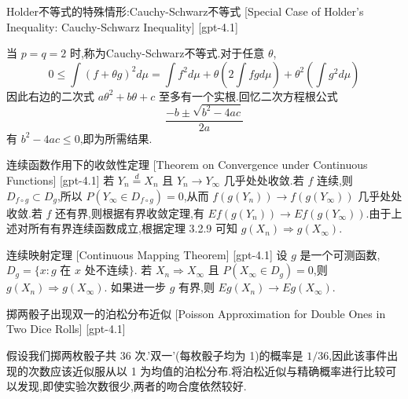 \documentclass[UTF8]{ctexart}
\begin{document}
    
    
    \begin{ppt}
        {Holder不等式的特殊情形:Cauchy-Schwarz不等式}
        [Special Case of Holder's Inequality: Cauchy-Schwarz Inequality]
        [gpt-4.1]
        
当 $p = q = 2$ 时,称为Cauchy-Schwarz不等式.对于任意 $\theta$,
\[
0 \leq \int (f + \theta g)^{2} d\mu = \int f^{2} d\mu + \theta \left( 2 \int f g d\mu \right) + \theta^{2} \left( \int g^{2} d\mu \right)
\]
因此右边的二次式 $a \theta^{2} + b \theta + c$ 至多有一个实根.回忆二次方程根公式
\[
\frac{ -b \pm \sqrt{b^{2} - 4 a c} }{2a}
\]
有 $b^{2} - 4ac \leq 0$,即为所需结果.

    \end{ppt}
    
    
    
    \begin{thm}
        {连续函数作用下的收敛性定理}
        [Theorem on Convergence under Continuous Functions]
        [gpt-4.1]
        若 $Y_n \overset{d}{=} X_n$ 且 $Y_n \to Y_\infty$ 几乎处处收敛.若 $f$ 连续,则 $D_{f \circ g} \subset D_g$,所以 $P(Y_\infty \in D_{f \circ g}) = 0$,从而 $f(g(Y_n)) \to f(g(Y_\infty))$ 几乎处处收敛.若 $f$ 还有界,则根据有界收敛定理,有 $E f(g(Y_n)) \to E f(g(Y_\infty))$.由于上述对所有有界连续函数成立,根据定理 3.2.9 可知 $g(X_n) \Rightarrow g(X_\infty)$.
    \end{thm}
    
    
    
    \begin{thm}
        {连续映射定理}
        [Continuous Mapping Theorem]
        [gpt-4.1]
        设 $g$ 是一个可测函数,$D_{g} = \{x : g$ 在 $x$ 处不连续$\}$.
若 $X_{n} \Rightarrow X_{\infty}$ 且 $P(X_{\infty} \in D_{g}) = 0$,则 $g(X_{n}) \Rightarrow g(X_{\infty})$.
如果进一步 $g$ 有界,则 $E g(X_{n}) \to E g(X_{\infty})$.
    \end{thm}
    
    
    
    \begin{xmp}
        {掷两骰子出现双一的泊松分布近似}
        [Poisson Approximation for Double Ones in Two Dice Rolls]
        [gpt-4.1]
        
假设我们掷两枚骰子共 36 次.'双一'(每枚骰子均为 1)的概率是 $1/36$,因此该事件出现的次数应该近似服从以 1 为均值的泊松分布.将泊松近似与精确概率进行比较可以发现,即使实验次数很少,两者的吻合度依然较好.

    \end{xmp}
    
\end{document}
